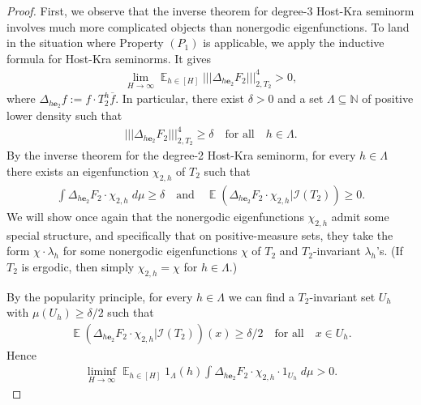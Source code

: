 \documentclass[11pt]{amsart}
\theoremstyle{definition}
\DeclareMathOperator*{\E}{\mathbb{E}}
\newcommand{\N}{{\mathbb N}}
\newcommand{\CI}{{\mathcal I}}
\newcommand{\be}{{\mathbf{e}}}
\newcommand{\nnorm}[1]{\lvert\!|\!| #1|\!|\!\rvert}
\newcommand{\1}{{\mathbf{1}}}
\begin{document}
\begin{proof}
    First, we observe that the inverse theorem for degree-3 Host-Kra seminorm involves much more complicated objects than nonergodic eigenfunctions. To land in the situation where Property $(P_1)$ is applicable, we apply the inductive formula for Host-Kra seminorms. It gives
    \begin{align*}
        \lim_{H\to\infty}\E_{h\in[H]}\nnorm{\Delta_{h\be_2} F_2}_{2, T_2}^4 >0,
    \end{align*}
    where $\Delta_{h\be_2}f:=f\cdot T_2^h\overline{f}$.
    In particular, there exist $\delta>0$ and  a set $\Lambda\subseteq \N$ of positive lower density such that 
    \begin{align}\label{E: lower bound on Lambda}
        \nnorm{\Delta_{h\be_2} F_2}_{2, T_2}^4 \geq \delta \quad \textrm{for all}\quad h\in \Lambda.
    \end{align}
    By the inverse theorem for the degree-2 Host-Kra seminorm, for every $h\in\Lambda$ there exists an eigenfunction $\chi_{2,h}$ of $T_2$ such that 
    \begin{align*}%
        \int \Delta_{h\be_2} F_2 \cdot {\chi_{2,h}}\; d\mu \geq \delta\quad \textrm{and} \quad \E(\Delta_{h\be_2} F_2\cdot {\chi_{2,h}}|\CI(T_2))\geq 0.
    \end{align*}
    We will show once again that the nonergodic eigenfunctions $\chi_{2,h}$ admit some special structure, and specifically that on positive-measure sets, they take the form $\chi\cdot \lambda_h$ for some nonergodic eigenfunctions $\chi$ of $T_2$ and $T_2$-invariant $\lambda_h$'s. (If $T_2$ is ergodic, then simply $\chi_{2,h} = \chi$ for $h\in\Lambda$.)
    
    By the popularity principle, for every $h\in\Lambda$ we can find a $T_2$-invariant set $U_h$ with $\mu(U_h)\geq \delta/2$ such that
    \begin{align}\label{E: lower bound on U s=3}
        \E(\Delta_{h\be_2} F_2\cdot {\chi_{2,h}}|\CI(T_2))(x) \geq \delta/2 \quad \textrm{for all}\quad x\in U_h.
    \end{align}
    Hence
    \begin{align}\label{E: original positivity s=3}
        \liminf_{H\to\infty}\E_{h\in[H]} 1_\Lambda(h)\int \Delta_{h\be_2} F_2 \cdot {\chi_{2,h}}\cdot 1_{U_h}\; d\mu > 0.
    \end{align}


\end{proof}
\end{document}
